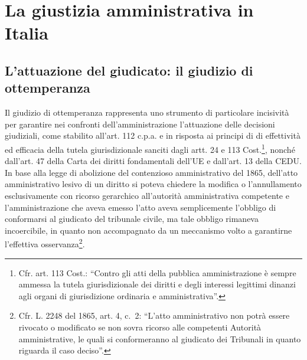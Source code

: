 \documentclass[12pt,it,a4paper,]{report}
\begin{document}
\begin{tabbing}
\end{tabbing}
\newpage

\setcounter{page}{1}
\doublespacing
\setlength{\parindent}{0.5in}

\hypertarget{la-giustizia-amministrativa-in-italia}{%
\chapter{La giustizia amministrativa in
Italia}\label{la-giustizia-amministrativa-in-italia}}

\hypertarget{lattuazione-del-giudicato-il-giudizio-di-ottemperanza}{%
\section{L'attuazione del giudicato: il giudizio di
ottemperanza}\label{lattuazione-del-giudicato-il-giudizio-di-ottemperanza}}

Il giudizio di ottemperanza rappresenta uno strumento di particolare
incisività per garantire nei confronti dell'amministrazione l'attuazione
delle decisioni giudiziali, come stabilito all'art. 112 c.p.a. e in
risposta ai principi di di effettività ed efficacia della tutela
giurisdizionale sanciti dagli artt. 24 e 113 Cost.\footnote{Cfr. art.
  113 Cost.: ``Contro gli atti della pubblica amministrazione è sempre
  ammessa la tutela giurisdizionale dei diritti e degli interessi
  legittimi dinanzi agli organi di giurisdizione ordinaria e
  amministrativa''.}, nonché dall'art. 47 della Carta dei diritti
fondamentali dell'UE e dall'art. 13 della CEDU. In base alla legge di
abolizione del contenzioso amministrativo del 1865, dell'atto
amministrativo lesivo di un diritto si poteva chiedere la modifica o
l'annullamento esclusivamente con ricorso gerarchico all'autorità
amministrativa competente e l'amministrazione che aveva emesso l'atto
aveva semplicemente l'obbligo di conformarsi al giudicato del tribunale
civile, ma tale obbligo rimaneva incoercibile, in quanto non
accompagnato da un meccanismo volto a garantirne l'effettiva
osservanza\footnote{Cfr. L. 2248 del 1865, art. 4, c.~2: ``L'atto
  amministrativo non potrà essere rivocato o modificato se non sovra
  ricorso alle competenti Autorità amministrative, le quali si
  conformeranno al giudicato dei Tribunali in quanto riguarda il caso
  deciso''.}.
\end{document}
